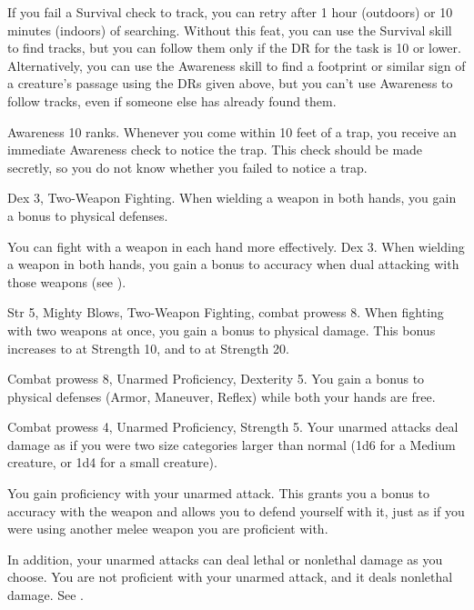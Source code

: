 If you fail a Survival check to track, you can retry after 1 hour (outdoors) or 10 minutes (indoors) of searching.
Without this feat, you can use the Survival skill to find tracks, but you can follow them only if the DR for the task is 10 or lower.
Alternatively, you can use the Awareness skill to find a footprint or similar sign of a creature's passage using the DRs given above, but you can't use Awareness to follow tracks, even if someone else has already found them.

\featpre Awareness 10 ranks.
\featben Whenever you come within 10 feet of a trap, you receive an immediate Awareness check to notice the trap.
This check should be made secretly, so you do not know whether you failed to notice a trap.

\featpres Dex 3, Two-Weapon Fighting.
\featben When wielding a weapon in both hands, you gain a  bonus to physical defenses.

You can fight with a weapon in each hand more effectively.
\featpre Dex 3.
\featben When wielding a weapon in both hands, you gain a  bonus to accuracy when dual attacking with those weapons (see ).

\featpres Str 5, Mighty Blows, Two-Weapon Fighting, combat prowess 8.
\featben When fighting with two weapons at once, you gain a  bonus to physical damage.
This bonus increases to  at Strength 10, and to  at Strength 20.

\featpre Combat prowess 8, Unarmed Proficiency, Dexterity 5.
\featben You gain a  bonus to physical defenses (Armor, Maneuver, Reflex) while both your hands are free.

\featpres Combat prowess 4, Unarmed Proficiency, Strength 5.
\featben Your unarmed attacks deal damage as if you were two size categories larger than normal (1d6 for a Medium creature, or 1d4 for a small creature).

\featben You gain proficiency with your unarmed attack.
This grants you a  bonus to accuracy with the weapon and allows you to defend yourself with it, just as if you were using another melee weapon you are proficient with.

In addition, your unarmed attacks can deal lethal or nonlethal damage as you choose.
 You are not proficient with your unarmed attack, and it deals nonlethal damage. See .

